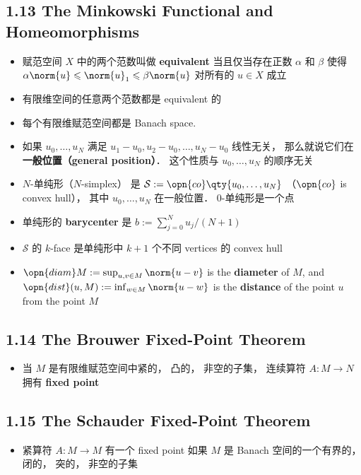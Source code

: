\subsection{1.13 The Minkowski Functional and Homeomorphisms}
\begin{itemize}
\item 赋范空间 $X$ 中的两个范数叫做 \textbf{equivalent} 当且仅当存在正数 $\alpha$ 和 $\beta$ 使得 $\alpha \norm{u} \leqslant \norm{u}_1 \leqslant \beta \norm{u}$ 对所有的 $u \in X$ 成立

\item 有限维空间的任意两个范数都是 equivalent 的

\item 每个有限维赋范空间都是 Banach space.

\item 如果 $u_0, \dots, u_N$  满足 $u_1 - u_0, u_2 - u_0,\dots, u_N - u_0$ 线性无关， 那么就说它们在\textbf{一般位置（general position）}． 这个性质与 $u_0, \dots, u_N$ 的顺序无关

\item $N$-单纯形（$N$-simplex） 是 $\mathcal S := \opn{co}\qty{u_0, \dots, u_N}$ （$\opn{co}$ is convex hull）， 其中 $u_0, \dots, u_N$ 在一般位置． $0$-单纯形是一个点

\item 单纯形的 \textbf{barycenter} 是 $b := \sum_{j=0}^N u_j / (N+1)$

\item $\mathcal S$ 的 $k$-face 是单纯形中 $k+1$ 个不同 vertices 的 convex hull

\item $\opn{diam} M := \sup_{u, v\in M} \norm{u - v}$ is the \textbf{diameter} of $M$, and $\opn{dist}(u, M) := \inf_{w \in M} \norm{u - w}$ is the \textbf{distance} of the point $u$ from the point $M$
\end{itemize}

\subsection{1.14 The Brouwer Fixed-Point Theorem}

\begin{itemize}
\item 当 $M$ 是有限维赋范空间中紧的， 凸的， 非空的子集， 连续算符 $A: M \to N$ 拥有 \textbf{fixed point}
\end{itemize}

\subsection{1.15 The Schauder Fixed-Point Theorem}
\begin{itemize}
\item 紧算符 $A: M \to M$ 有一个 fixed point 如果 $M$ 是 Banach 空间的一个有界的， 闭的， 突的， 非空的子集
\end{itemize}

